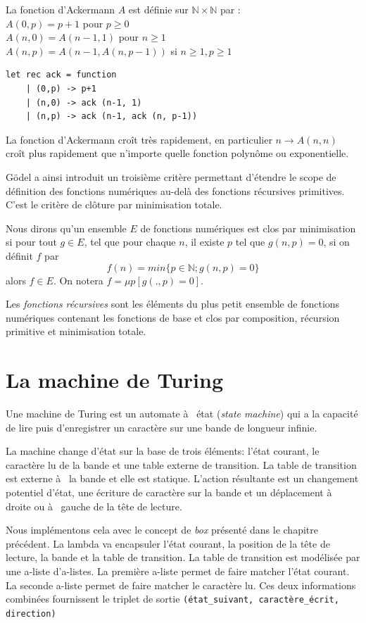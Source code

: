 \documentclass[11pt]{book}
\begin{document}
La fonction d’Ackermann $A$ est définie sur $\mathbb{N} × \mathbb{N}$ par : \\
$A(0, p) = p + 1$ pour $p ≥ 0$ \\
$A(n, 0) = A(n − 1, 1)$ pour $n ≥ 1$ \\
$A(n, p) = A(n − 1, A(n, p − 1))$ si $n ≥ 1, p ≥ 1$ \\ 

\begin{Verbatim}
let rec ack = function
	| (0,p) -> p+1
	| (n,0) -> ack (n-1, 1)
	| (n,p) -> ack (n-1, ack (n, p-1))
\end{Verbatim}


La fonction d’Ackermann croît très rapidement, en particulier $n \rightarrow A(n, n)$ croît
plus rapidement que n’importe quelle fonction polynôme ou exponentielle.


Gödel a ainsi introduit un troisième critère permettant d'étendre le scope de définition des
fonctions numériques au-delà des fonctions récursives primitives. C'est le critère
de clôture par minimisation totale.

Nous dirons qu'un ensemble $E$ de fonctions numériques est clos par minimisation si
pour tout $g \in E$, tel que pour chaque $n$, il existe $p$ tel que $g(n,p)=0$, si on définit
$f$ par
$$ f(n) = min\{p\in \mathbb{N} ; g(n,p) = 0   \} $$
alors $f\in E$. On notera $f =\mu p [g(.,p)=0]$.

Les  \textit{fonctions récursives} sont les éléments du plus petit ensemble de fonctions
numériques contenant les fonctions de base et clos par composition, récursion primitive et 
minimisation totale.

\section{La machine de Turing}
Une machine de Turing est un automate à  état (\textit{state machine}) qui a la
capacité de lire puis  d'enregistrer un caractère sur une bande de longueur
infinie. 

La machine change d'état sur la base de trois éléments: l'état courant,
le caractère lu de la bande et une table externe de transition. La table de
transition est externe à  la bande et elle est statique.
 L'action résultante est un changement potentiel d'état, une écriture de
 caractère sur la bande et un déplacement à  droite ou à  gauche de la tête de
 lecture.

Nous implémentons cela avec le concept de \textit{box} présenté dans le chapitre
précédent. La lambda va encapsuler l'état courant, la position de la tête de
lecture, la bande et la table de transition.
La table de transition est modélisée par une a-liste d'a-listes.
La première a-liste permet de faire matcher l'état courant.
La seconde a-liste permet de faire matcher le caractère lu.
Ces deux informations combinées fournissent  le triplet de sortie
\verb+(état_suivant, caractère_écrit, direction)+
\end{document}
